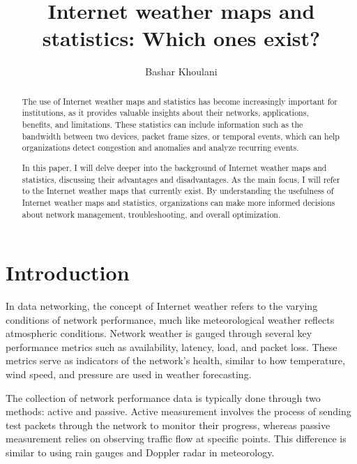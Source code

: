 \documentclass[sigconf,authorversion,nonacm]{acmart}
\begin{document}

\title{Internet weather maps and statistics: Which ones exist?}

\author{Bashar Khoulani}

\begin{abstract}
The use of Internet weather maps and statistics has become increasingly important for institutions, as it provides valuable insights about their networks, applications, benefits, and limitations. These statistics can include information such as the bandwidth between two devices, packet frame sizes, or temporal events, which can help organizations detect congestion and anomalies and analyze recurring events. 

In this paper, I will delve deeper into the background of Internet weather maps and statistics, discussing their advantages and disadvantages. As the main focus, I will refer to the Internet weather maps that currently exist. By understanding the usefulness of Internet weather maps and statistics, organizations can make more informed decisions about network management, troubleshooting, and overall optimization.
\end{abstract}
\maketitle
\section{Introduction}
In data networking, the concept of Internet weather refers to the varying conditions of network performance, much like meteorological weather reflects atmospheric conditions. Network weather is gauged through several key performance metrics such as availability, latency, load, and packet loss. These metrics serve as indicators of the network's health, similar to how temperature, wind speed, and pressure are used in weather forecasting.

The collection of network performance data is typically done through two methods: active and passive. Active measurement involves the process of sending test packets through the network to monitor their progress, whereas passive measurement relies on observing traffic flow at specific points. This difference is similar to using rain gauges and Doppler radar in meteorology.
\end{document}
